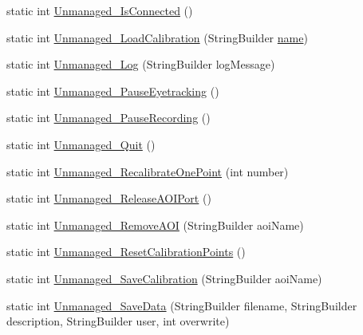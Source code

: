 \begin{DoxyCompactItemize}
\item 
static int \hyperlink{class_web_analyzer_1_1_eye_tracking_1_1_eye_tracking_controller_a3c5a3f00aebfa5783603d222cafc3e7c}{Unmanaged\+\_\+\+Is\+Connected} ()
\item 
static int \hyperlink{class_web_analyzer_1_1_eye_tracking_1_1_eye_tracking_controller_a713c2ddfbfa2c32b7e884794d5b3698c}{Unmanaged\+\_\+\+Load\+Calibration} (String\+Builder \hyperlink{_u_i_2_h_t_m_l_resources_2js_2src_2create__experiment_8js_adac2bcb4f01b574cbc63fe8ee2c56bf0}{name})
\item 
static int \hyperlink{class_web_analyzer_1_1_eye_tracking_1_1_eye_tracking_controller_a2eda8d88cb46776de4b394fc2a0732b0}{Unmanaged\+\_\+\+Log} (String\+Builder log\+Message)
\item 
static int \hyperlink{class_web_analyzer_1_1_eye_tracking_1_1_eye_tracking_controller_a6d503085a7e573a3cb8739f565e96662}{Unmanaged\+\_\+\+Pause\+Eyetracking} ()
\item 
static int \hyperlink{class_web_analyzer_1_1_eye_tracking_1_1_eye_tracking_controller_aa65720720634c95fa5a2ef9183030fdd}{Unmanaged\+\_\+\+Pause\+Recording} ()
\item 
static int \hyperlink{class_web_analyzer_1_1_eye_tracking_1_1_eye_tracking_controller_adf05304c2fcffc951c7c4e97202d53f2}{Unmanaged\+\_\+\+Quit} ()
\item 
static int \hyperlink{class_web_analyzer_1_1_eye_tracking_1_1_eye_tracking_controller_a54802e80f5a89d297cc89746e653ad7c}{Unmanaged\+\_\+\+Recalibrate\+One\+Point} (int number)
\item 
static int \hyperlink{class_web_analyzer_1_1_eye_tracking_1_1_eye_tracking_controller_a522ef92feef19efa94b66fdb9050e13e}{Unmanaged\+\_\+\+Release\+A\+O\+I\+Port} ()
\item 
static int \hyperlink{class_web_analyzer_1_1_eye_tracking_1_1_eye_tracking_controller_a01019c44a253be09fa6de4bc98f1534e}{Unmanaged\+\_\+\+Remove\+A\+O\+I} (String\+Builder aoi\+Name)
\item 
static int \hyperlink{class_web_analyzer_1_1_eye_tracking_1_1_eye_tracking_controller_a8a996ed1dd5cdd9d729031cba19839b0}{Unmanaged\+\_\+\+Reset\+Calibration\+Points} ()
\item 
static int \hyperlink{class_web_analyzer_1_1_eye_tracking_1_1_eye_tracking_controller_a55302d7d15bad7cf2453d9ed64ca54a7}{Unmanaged\+\_\+\+Save\+Calibration} (String\+Builder aoi\+Name)
\item 
static int \hyperlink{class_web_analyzer_1_1_eye_tracking_1_1_eye_tracking_controller_ae64882eea2bbf807174c26f3f7f9b579}{Unmanaged\+\_\+\+Save\+Data} (String\+Builder filename, String\+Builder description, String\+Builder user, int overwrite)

\end{DoxyCompactItemize}
